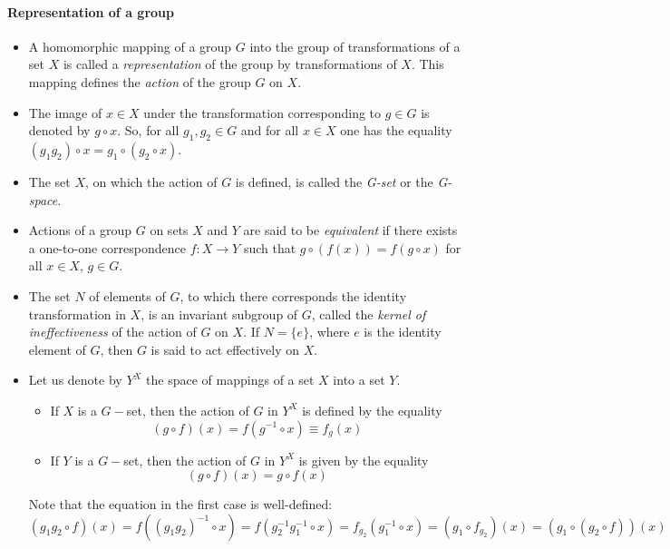 \paragraph{Representation of a group}
\begin{itemize}
	\item A homomorphic mapping of a group $G$ into the group of transformations of
	a set $X$ is called a \emph{representation} of the group by transformations of $X$. This mapping defines the \emph{action} of the group $G$ on $X$.
	\item The image of $x\in X$ under the transformation corresponding to $g\in G$ is denoted by $g\circ x$. So, for all $g_1,g_2 \in G$
	and for all $x \in X$ one has the equality $(g_1g_2)\circ x=g_1\circ (g_2\circ x)$.
	\item The set $X$, on which the action of $G$ is defined, is called the \emph{G-set} or the \emph{G-space}.
	\item Actions of a group $G$ on sets $X$ and $Y$ are said to be \emph{equivalent} if there exists a one-to-one correspondence $f:X\rightarrow Y$ such that $g\circ(f(x))=f(g\circ x)$ for all $x\in X$, $g\in G$.
	\item The set $N$ of elements of $G$, to which there corresponds the identity transformation in $X$, is an invariant subgroup of $G$, called the \emph{kernel of ineffectiveness} of the action of $G$ on $X$. If $N = \{e\}$, where $e$ is the identity element of $G$, then $G$ is said to act effectively on $X$.
	\item Let us denote by $Y^X$ the space of mappings of a set $X$ into a set $Y$.
	\begin{itemize}
		\item  If $X$ is a $G-$set, then the action of $G$ in $Y^X$ is defined by the equality $$(g\circ f)(x)=f(g^{-1}\circ x)\equiv f_g(x)$$
		\item If $Y$ is a $G-$set, then the action of $G$ in $Y^X$ is given by the equality $$(g\circ f)(x)=g\circ f(x)$$
	\end{itemize}
	Note that the equation in the first case is well-defined: $$(g_1g_2\circ f)(x)=f((g_1g_2)^{-1}\circ x)=f(g_2^{-1}g_1^{-1}\circ x)=f_{g_2}(g_1^{-1}\circ x)=(g_1\circ f_{g_2})(x)=(g_1\circ (g_2\circ f))(x)$$
	
\end{itemize}
